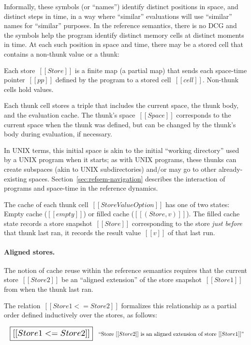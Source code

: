 \documentclass[11pt]{article}
\begin{document}
Informally, these symbols (or ``names'') identify distinct positions
in space, and distinct steps in time, in a way where ``similar''
evaluations will use ``similar'' names for ``similar'' purposes.
%
In the reference semantics, there is no DCG and the symbols help the
program identify distinct memory cells at distinct moments in time.
%
At each such position in space and time, there may be a stored cell
that contains a non-thunk value or a thunk:


\ottgrammartabular{\ottStore}
\ottgrammartabular{\ottcell}
\ottgrammartabular{\ottStoreValueOption}

Each store~$[[Store]]$ is a finite map (a partial map) that sends each space-time pointer~$[[pp]]$
defined by the program to a stored cell~$[[cell]]$.
%
Non-thunk cells hold values.

Each thunk cell stores a triple that includes the current space, the thunk body, and the evaluation cache.
%
The thunk's space~$[[Space]]$ corresponds to the current
space when the thunk was defined, but can be changed by the thunk's body during
evaluation, if necessary.

In UNIX terms, this initial space is akin to the initial ``working
directory'' used by a UNIX program when it starts; as with UNIX
programs, these thunks can create subspaces (akin to UNIX
subdirectories) and/or may go to other already-existing spaces.
%
Section~\ref{sec:refsem-navigation} describes the interaction of
programs and space-time in the reference dynamics.

The cache of each thunk cell~$[[StoreValueOption]]$ has one of two states:
Empty cache ($[[empty]]$) or
filled cache ($[[(Store, v)]]$).
%
The filled cache state records a store snapshot~$[[Store]]$
corresponding to the store \emph{just before} that thunk last ran,
it records the result value~$[[v]]$ of that last run.

\paragraph{Aligned stores.}

The notion of cache reuse within the reference semantics requires that
the current store~$[[Store2]]$ be an ``aligned extension'' of the store
snapshot~$[[Store1]]$ from when the thunk last ran.

The relation~$[[Store1 <= Store2]]$ formalizes this relationship as a
partial order defined inductively over the stores, as follows:

\[
\begin{array}{ll}\scalebox{1.5}{
\boxed{
  [[Store1 <= Store2]]
}}
&
\text{``Store $[[Store2]]$ is an aligned extension of store~$[[Store1]]$''}
\end{array}
\]
\end{document}
